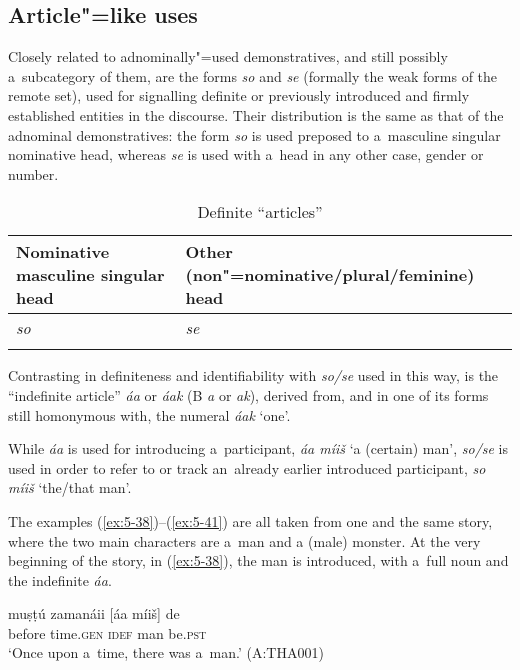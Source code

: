 \subsection{Article"=like uses}
\label{subsec:5-2-6}

Closely related to adnominally"=used demonstratives, and still possibly a~subcategory of them, are the forms \textit{so} and \textit{se} (formally the weak forms of the remote set), used for signalling definite or previously introduced and firmly established entities in the discourse. Their distribution is the same as that of the adnominal demonstratives: the form \textit{so} is used preposed to a~masculine singular nominative head, whereas \textit{se} is used with a~head in any other case, gender or number. 


\begin{table}[ht]
 \caption{Definite ``articles''}
\begin{tabularx}{\textwidth}{ Q Q }
\lsptoprule
Nominative masculine singular head &
Other (non"=nominative/plural/feminine) head\\\hline
\textit{so} &
\textit{se} \\\lspbottomrule
\end{tabularx}
\label{tab:5-5}
\end{table}

Contrasting in definiteness and identifiability with \textit{so/se} used in this way, is the ``indefinite article'' \textit{áa} or \textit{áak} (B \textit{a} or \textit{ak}), derived from, and in one of its forms still homonymous with, the numeral \textit{áak} `one'.

While \textit{áa} is used for introducing a~participant, \textit{áa míiš} `a (certain) man', \textit{so/se} is used in order to refer to or track an~already earlier introduced participant, \textit{so míiš} `the/that man'.


  The examples (\ref{ex:5-38})--(\ref{ex:5-41}) are all taken from one and the same story, where the
  two main characters are a~man and a (male) monster. At the very beginning of the story, in
  (\ref{ex:5-38}), the man is introduced, with a~full noun and the indefinite \textit{áa}.

\begin{exe}
\ex
\label{ex:5-38}
\gll muṣṭú zamanáii [áa míiš] de\\
before time.\textsc{gen} \textsc{idef} man be.\textsc{pst}\\
\glt `Once upon a~time, there was a~man.' (A:THA001)
\end{exe}

